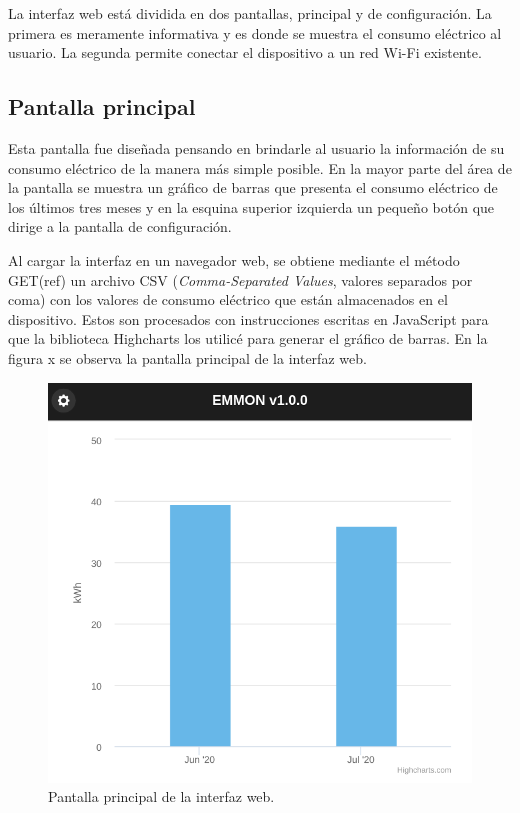 La interfaz web está dividida en dos pantallas, principal y de configuración. La primera es meramente informativa y es donde se muestra el consumo eléctrico al usuario. La segunda permite conectar el dispositivo a un red Wi-Fi existente.

\subsection{Pantalla principal}

Esta pantalla fue diseñada pensando en brindarle al usuario la información de su consumo eléctrico de la manera más simple posible. En la mayor parte del área de la pantalla se muestra un gráfico de barras que presenta el consumo eléctrico de los últimos tres meses y en la esquina superior izquierda un pequeño botón que dirige a la pantalla de configuración.

Al cargar la interfaz en un navegador web, se obtiene mediante el método GET(ref) un archivo CSV (\textit{Comma-Separated Values}, valores separados por coma) con los valores de consumo eléctrico que están almacenados en el dispositivo. Estos son procesados con instrucciones escritas en JavaScript para que la biblioteca Highcharts los utilicé para generar el gráfico de barras. En la figura x se observa la pantalla principal de la interfaz web.

\begin{figure}[h]
	\centering
	\includegraphics[scale=0.5]{./Figures/interface_main.png}
	\caption{Pantalla principal de la interfaz web.}
	\label{fig:blocksTest}
\end{figure}


